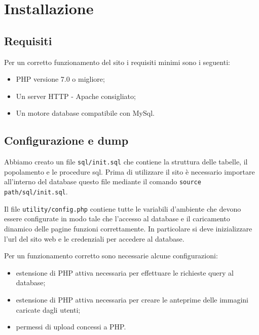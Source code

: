 \section{Installazione}
	\subsection{Requisiti}
	\par Per un corretto funzionamento del sito i requisiti minimi sono i seguenti:
	\begin{itemize}
		\item PHP versione 7.0 o migliore;
		\item Un server HTTP - Apache consigliato;
		\item Un motore database compatibile con MySql.
	\end{itemize}
	\subsection{Configurazione e dump}
  \par Abbiamo creato un file \texttt{sql/init.sql} che contiene la struttura delle tabelle, il popolamento e le procedure sql. Prima di utilizzare il sito \`e necessario importare all'interno del database questo file mediante il comando \texttt{source path/sql/init.sql}.
  \par Il file \texttt{utility/config.php} contiene tutte le variabili d'ambiente che devono essere configurate in modo tale che l'accesso al database e il caricamento dinamico delle pagine funzioni correttamente. In particolare si deve inizializzare l'url del sito web e le credenziali per accedere al database.
	\par Per un funzionamento corretto sono necessarie alcune configurazioni:
	\begin{itemize}
		\item estensione  di PHP attiva necessaria per effettuare le richieste query al database;
		\item estensione  di PHP attiva necessaria per creare le anteprime delle immagini caricate dagli utenti;
		\item permessi di upload concessi a PHP.
	\end{itemize}
